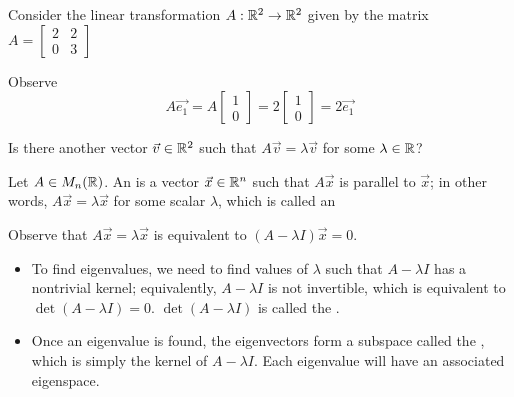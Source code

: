 
\begin{applicationActivities}{3}{28}

\begin{activity}{0}
Consider the linear transformation $A : \mathbb{R}^2 \rightarrow \mathbb{R}^2$ given by the matrix $A = \begin{bmatrix} 2 & 2 \\ 0 & 3 \end{bmatrix}$

\begin{center}
\end{center}
Observe $$A\vec{e_1} = A\begin{bmatrix}1 \\ 0 \end{bmatrix} = 2 \begin{bmatrix}1 \\ 0 \end{bmatrix} = 2 \vec{e_1}$$

Is there another vector $\vec{v} \in \mathbb{R}^2$ such that $A\vec{v}=\lambda \vec{v}$ for some $\lambda \in \mathbb{R}$?
\end{activity}

\begin{definition}Let $A \in M_n(\mathbb{R})$.
An  is a vector $\vec{x} \in \mathbb{R}^n$ such that $A\vec{x}$ is parallel to $\vec{x}$; in other words, $A\vec{x}=\lambda \vec{x}$ for some scalar $\lambda$, which is called an 
\end{definition}

\begin{observation}
Observe that $A\vec{x}=\lambda \vec{x}$ is equivalent to $(A-\lambda I)\vec{x} = 0$.
\begin{itemize}
\item To find eigenvalues, we need to find values of $\lambda$ such that $A-\lambda I$ has a nontrivial kernel; equivalently, $A-\lambda I$ is not invertible, which is equivalent to $\det(A-\lambda I)=0$.  $\det(A-\lambda I)$ is called the .
\item Once an eigenvalue is found, the eigenvectors form a subspace called the , which is simply the kernel of $A-\lambda I$.  Each eigenvalue will have an associated eigenspace.
\end{itemize}
\end{observation}


\end{applicationActivities}
